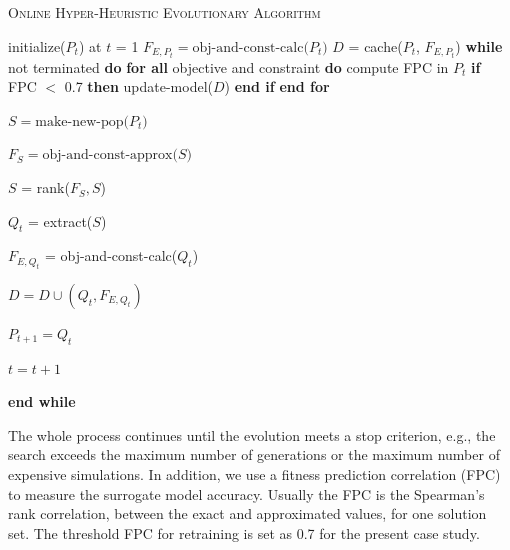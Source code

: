 \begin{algorithm}[t]
\footnotesize
\caption{\textsc{Online Hyper-Heuristic Evolutionary Algorithm}}
\begin{algorithmic}[1]
\State initialize($P_t$) at $t$ = 1
\State $F_{E,P_t} = \textrm{obj-and-const-calc(} P_{t} \textrm{)}$
\State $D$ = cache($P_t$, $F_{E,P_t}$)
\State \textbf{while} \textrm{not terminated} \textbf{do}
\color{blue}
\State \qquad \textbf{for all} \textrm{objective and constraint} \textbf{do}
\State \qquad\qquad \textrm{compute FPC in $P_{t}$}
\State \qquad\qquad \textbf{if} \textrm{FPC $<$ 0.7} \textbf{then}
\State \qquad\qquad \qquad \textrm{update-model($D$)}
\State \qquad\qquad \textbf{end if}
\State \qquad\textbf{end for}

\State \qquad $S = \textrm{make-new-pop(} P_{t} \textrm{)}$

\State \qquad $F_S = \textrm{obj-and-const-approx(} S \textrm{)}$

\State \qquad $S$ = rank($F_S, S$) 

\State \qquad $Q_t$ = extract($S$) 
\color{black}

\State \qquad $F_{E,Q_t}$ = obj-and-const-calc($Q_t$) 

\State \qquad $D = D \cup (Q_t, F_{E,Q_t})$ 

\State \qquad $P_{t+1} = Q_t$ 

\State \qquad $t = t+1$

\State \textbf{end while}

\end{algorithmic}
\end{algorithm}

The whole process continues until the evolution meets a stop criterion, e.g., the search exceeds the maximum number of generations or the maximum number of expensive simulations. In addition, we use a fitness prediction correlation (FPC) to measure the surrogate model accuracy. Usually the FPC is the Spearman's rank correlation, between the exact and approximated values, for one solution set. The threshold FPC for retraining is set as 0.7 \cite{brownlee2015constrained} for the present case study.